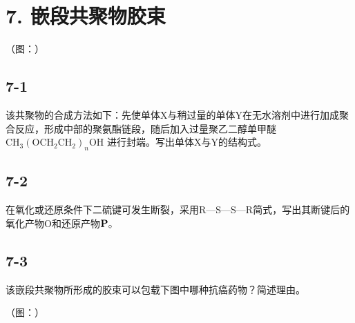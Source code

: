 \section*{7. 嵌段共聚物胶束}
（图：）

\subsection*{7-1}
该共聚物的合成⽅法如下：先使单体X与稍过量的单体Y在⽆⽔溶剂中进⾏加成聚合反应，形成中部的聚氨酯链段，随后加⼊过量聚⼄⼆醇单甲醚 $\mathrm { C H } _ { 3 } ( \mathrm { O C H } _ { 2 } \mathrm { C H } _ { 2 } ) _ { n } \mathrm { O H }$ 进⾏封端。写出单体X与Y的结构式。

\subsection*{7-2}
在氧化或还原条件下⼆硫键可发⽣断裂，采⽤R—S—S—R简式，写出其断键后的氧化产物O和还原产物${ \bf P } _ { \circ }$

\subsection*{7-3}
该嵌段共聚物所形成的胶束可以包载下图中哪种抗癌药物？简述理由。

（图：）
